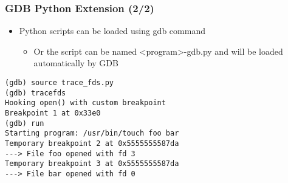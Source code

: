 \begin{frame}[fragile]
  \frametitle{GDB Python Extension (2/2)}
  \begin{itemize}
    \item Python scripts can be loaded using gdb  command
    \begin{itemize}
      \item Or the script can be named <program>-gdb.py and will be loaded automatically by GDB
    \end{itemize}
  \end{itemize}
  \begin{block}{}
    \begin{verbatim}
(gdb) source trace_fds.py 
(gdb) tracefds 
Hooking open() with custom breakpoint
Breakpoint 1 at 0x33e0
(gdb) run
Starting program: /usr/bin/touch foo bar
Temporary breakpoint 2 at 0x5555555587da
---> File foo opened with fd 3
Temporary breakpoint 3 at 0x5555555587da
---> File bar opened with fd 0
    \end{verbatim}
  \end{block}
\end{frame}

